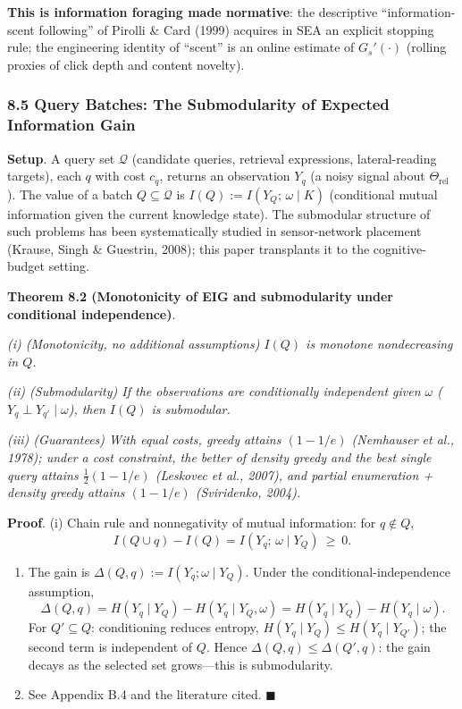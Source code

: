 \documentclass[
  11pt]{article}
\begin{document}
\textbf{This is information foraging made normative}: the descriptive
``information-scent following'' of Pirolli \& Card (1999) acquires in
SEA an explicit stopping rule; the engineering identity of ``scent'' is
an online estimate of \(G_s'(\cdot)\) (rolling proxies of click depth
and content novelty).

\subsubsection{8.5 Query Batches: The Submodularity of Expected
Information
Gain}\label{query-batches-the-submodularity-of-expected-information-gain}

\textbf{Setup}. A query set \(\mathcal{Q}\) (candidate queries,
retrieval expressions, lateral-reading targets), each \(q\) with cost
\(c_q\), returns an observation \(Y_q\) (a noisy signal about
\(\Theta_{\mathrm{rel}}\)). The value of a batch
\(Q \subseteq \mathcal{Q}\) is \(I(Q) := I(Y_Q;\, \omega \mid K)\)
(conditional mutual information given the current knowledge state). The
submodular structure of such problems has been systematically studied in
sensor-network placement (Krause, Singh \& Guestrin, 2008); this paper
transplants it to the cognitive-budget setting.

\textbf{Theorem 8.2 (Monotonicity of EIG and submodularity under
conditional independence)}.

\emph{(i) (Monotonicity, no additional assumptions) \(I(Q)\) is monotone
nondecreasing in \(Q\).}

\emph{(ii) (Submodularity) If the observations are conditionally
independent given \(\omega\) (\(Y_q \perp Y_{q'} \mid \omega\)), then
\(I(Q)\) is submodular.}

\emph{(iii) (Guarantees) With equal costs, greedy attains \((1-1/e)\)
(Nemhauser et al., 1978); under a cost constraint, the better of density
greedy and the best single query attains \(\frac12(1-1/e)\) (Leskovec et
al., 2007), and partial enumeration + density greedy attains \((1-1/e)\)
(Sviridenko, 2004).}

\textbf{Proof}. (i) Chain rule and nonnegativity of mutual information:
for \(q \notin Q\),
\[I(Q \cup q) - I(Q) = I(Y_q;\, \omega \mid Y_Q) \ \ge\ 0.\]

\begin{enumerate}
\def\labelenumi{(\roman{enumi})}
\setcounter{enumi}{1}
\item
  The gain is \(\Delta(Q, q) := I(Y_q; \omega \mid Y_Q)\). Under the
  conditional-independence assumption,
  \[\Delta(Q,q) = H(Y_q \mid Y_Q) - H(Y_q \mid Y_Q, \omega) = H(Y_q \mid Y_Q) - H(Y_q \mid \omega).\]
  For \(Q' \subseteq Q\): conditioning reduces entropy,
  \(H(Y_q \mid Y_Q) \le H(Y_q \mid Y_{Q'})\); the second term is
  independent of \(Q\). Hence \(\Delta(Q, q) \le \Delta(Q', q)\): the
  gain decays as the selected set grows---this is submodularity.
\item
  See Appendix B.4 and the literature cited. \(\blacksquare\)
\end{enumerate}
\end{document}
